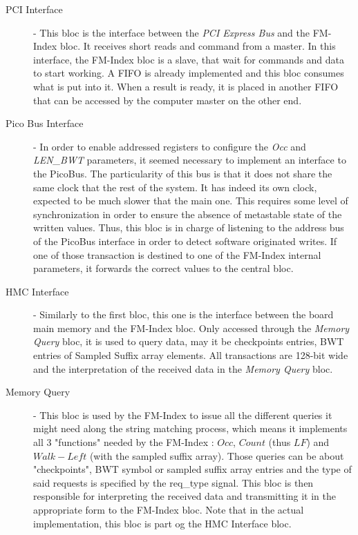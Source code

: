 \begin{description}
\item [PCI Interface] - This bloc is the interface between the \textsl{PCI Express Bus} and the FM-Index bloc. It receives short reads and command from a master. In this interface, the FM-Index bloc is a slave, that wait for commands and data to start working. A FIFO is already implemented and this bloc consumes what is put into it. When a result is ready, it is placed in another FIFO that can be accessed by the computer master on the other end.
\item[Pico Bus Interface] - In order to enable addressed registers to configure the \textit{Occ} and \textit{LEN\_BWT} parameters, it seemed necessary to implement an interface to the PicoBus. The particularity of this bus is that it does not share the same clock that the rest of the system. It has indeed its own clock, expected to be much slower that the main one. This requires some level of synchronization in order to ensure the absence of metastable state of the written values. Thus, this bloc is in charge of listening to the address bus of the PicoBus interface in order to detect software originated writes. If one of those transaction is destined to one of the FM-Index internal parameters, it forwards the correct values to the central bloc.
\item [HMC Interface] - Similarly to the first bloc, this one is the interface between the board main memory and the FM-Index bloc. Only accessed through the \textsl{Memory Query} bloc, it is used to query data, may it be checkpoints entries, BWT entries of Sampled Suffix array elements. All transactions are 128-bit wide and the interpretation of the received data in the \textsl{Memory Query} bloc.
\item [Memory Query] - This bloc is used by the FM-Index to issue all the different queries it might need along the string matching process, which means it implements all 3 "functions" needed by the FM-Index : $Occ$, $Count$ (thus $LF$) and $Walk-Left$ (with the sampled suffix array). Those queries can be about "checkpoints", BWT symbol or sampled suffix array entries and the type of said requests is specified by the \textrm{req\_type} signal. This bloc is then responsible for interpreting the received data and transmitting it in the appropriate form to the FM-Index bloc. Note that in the actual implementation, this bloc is part og the HMC Interface bloc.
\end{description}

